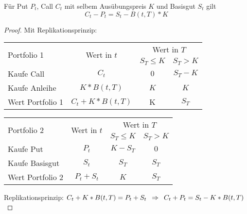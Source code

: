 \begin{lemma} %
	Für Put $P_t$, Call $C_t$ mit selbem Ausübungspreis $K$ und Basisgut $S_t$ gilt
	\begin{equation*}
		C_t - P_t = S_t - B(t,T) * K
	\end{equation*}
\end{lemma}
\begin{proof}
	Mit Replikationsprinzip:
	
	\begin{center}
		\begin{tabular}{|l|c|cc|}
			\hline 
			\multirow{2}{*}{Portfolio 1} & \multirow{2}{*}{Wert in $t$} & \multicolumn{2}{c|}{Wert in $T$} \\
			&& $S_T \le K$ & $S_T > K$ \\ \hline \hline
			Kaufe Call & $C_t$ & $0$ & $S_T - K$ \\
			Kaufe Anleihe & $K * B(t,T)$ & $K$ & $K$ \\ \hline
			Wert Portfolio 1 & $C_t + K * B(t,T)$ & K & $S_T$ \\ 
			\hline
		\end{tabular}
	\end{center}

	\begin{center}
		\begin{tabular}{|l|c|cc|}
			\hline 
			\multirow{2}{*}{Portfolio 2} & \multirow{2}{*}{Wert in $t$} & \multicolumn{2}{c|}{Wert in $T$} \\
			&& $S_T \le K$ & $S_T > K$ \\ \hline \hline
			Kaufe Put & $P_t$ & $K - S_T$ & $0$ \\
			Kaufe Basisgut & $S_t$ & $S_T$ & $S_T$ \\ \hline
			Wert Portfolio 2 & $P_t + S_t$ & $K$ & $S_T$ \\ 
			\hline
		\end{tabular}
	\end{center}

	Replikationsprinzip: $C_t + K * B(t,T) = P_t + S_t \enskip \Rightarrow \enskip C_t + P_t = S_t - K*B(t,T)$
\end{proof}

